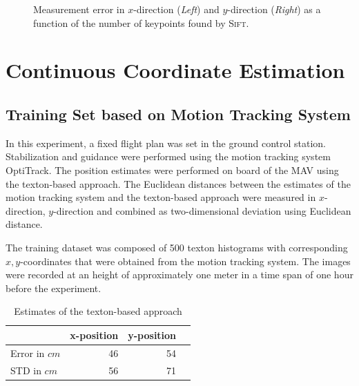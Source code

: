 \documentclass[11pt]{report}
\begin{document}
\begin{figure}
\begin{subfigure}[b]{0.5\textwidth}
  \label{fig:cosinesd}
  \end{subfigure}
  \caption{Measurement error in $x$-direction (\emph{Left}) and
    $y$-direction (\emph{Right}) as a function of the number of
    keypoints found by \textsc{Sift}.}
\label{fig:cosine}
\end{figure}

\section{Continuous Coordinate Estimation}

\subsection{Training Set based on Motion Tracking System}
\label{sec:experiment-real}


In this experiment, a fixed flight plan was set in the ground control
station. Stabilization and guidance were performed using the motion
tracking system OptiTrack. The position estimates were performed on
board of the MAV using the texton-based approach. The Euclidean
distances between the estimates of the motion tracking system and the
texton-based approach were measured in $x$-direction, $y$-direction
and combined as two-dimensional deviation using Euclidean
distance.

The training dataset was composed of 500 texton histograms with
corresponding $x,y$-coordinates that were obtained from the motion
tracking system. The images were recorded at an height of
approximately one meter in a time span of one hour before the
experiment.

\begin{table}[H]
  \centering
  \begin{tabular}{lrrr}
    \toprule
    & x-position & y-position\\
    \midrule
    Error in $cm$ & 46 & 54\\
    STD in $cm$ & 56 & 71\\
    \bottomrule
  \end{tabular}
  \caption[Estimates of the texton-based approach]{Estimates of the texton-based approach}
  \label{tab:route}
\end{table}

\end{document}
